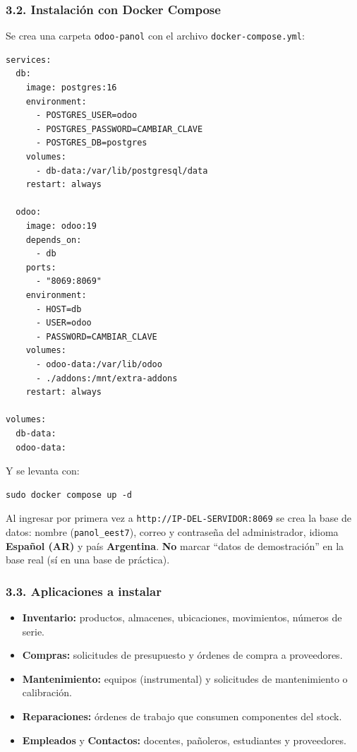 \subsubsection*{3.2. Instalación con Docker Compose}
Se crea una carpeta \texttt{odoo-panol} con el archivo \texttt{docker-compose.yml}:

\begin{verbatim}
services:
  db:
    image: postgres:16
    environment:
      - POSTGRES_USER=odoo
      - POSTGRES_PASSWORD=CAMBIAR_CLAVE
      - POSTGRES_DB=postgres
    volumes:
      - db-data:/var/lib/postgresql/data
    restart: always

  odoo:
    image: odoo:19
    depends_on:
      - db
    ports:
      - "8069:8069"
    environment:
      - HOST=db
      - USER=odoo
      - PASSWORD=CAMBIAR_CLAVE
    volumes:
      - odoo-data:/var/lib/odoo
      - ./addons:/mnt/extra-addons
    restart: always

volumes:
  db-data:
  odoo-data:
\end{verbatim}

Y se levanta con:
\begin{verbatim}
sudo docker compose up -d
\end{verbatim}

Al ingresar por primera vez a \texttt{http://IP-DEL-SERVIDOR:8069} se crea la base de datos:
nombre (\texttt{panol\_eest7}), correo y contraseña del administrador, idioma
\textbf{Español (AR)} y país \textbf{Argentina}. \textbf{No} marcar ``datos de demostración''
en la base real (sí en una base de práctica).

\subsubsection*{3.3. Aplicaciones a instalar}
\begin{itemize}
  \item \textbf{Inventario:} productos, almacenes, ubicaciones, movimientos, números de serie.
  \item \textbf{Compras:} solicitudes de presupuesto y órdenes de compra a proveedores.
  \item \textbf{Mantenimiento:} equipos (instrumental) y solicitudes de mantenimiento o
        calibración.
  \item \textbf{Reparaciones:} órdenes de trabajo que consumen componentes del stock.
  \item \textbf{Empleados} y \textbf{Contactos:} docentes, pañoleros, estudiantes y proveedores.
\end{itemize}

